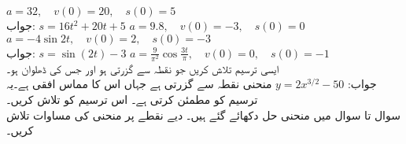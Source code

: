 $a=32,\quad v(0)=20,\quad s(0)=5$\\
جواب:\quad
$s=16t^2+20t+5$
$a=9.8,\quad v(0)=-3,\quad s(0)=0$
$a=-4\sin 2t,\quad v(0)=2,\quad s(0)=-3$\\
جواب:\quad
$s=\sin (2t)-3$
$a=\tfrac{9}{\pi^2}\cos\tfrac{3t}{\pi},\quad v(0)=0,\quad s(0)=-1$
\\
ایسی ترسیم  تلاش کریں جو نقطہ  سے گزرتی ہو اور جس کی ڈھلوان  ہو۔ \\
جواب:\quad
$y=2x^{3/2}-50$
منحنی  نقطہ  سے گزرتی ہے جہاں اس کا مماس افقی ہے۔یہ ترسیم  کو مطمئن کرتی ہے۔ اس ترسیم کو تلاش کریں۔
\\
سوال  تا سوال  میں منحنی حل دکھائے گئے ہیں۔ دیے نقطے پر منحنی کی مساوات تلاش کریں۔
